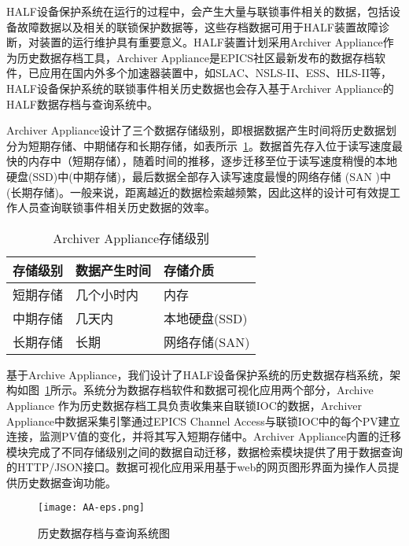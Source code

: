 HALF设备保护系统在运行的过程中，会产生大量与联锁事件相关的数据，包括设备故障数据以及相关的联锁保护数据等，这些存档数据可用于HALF装置故障诊断，对装置的运行维护具有重要意义。HALF装置计划采用Archiver Appliance作为历史数据存档工具，Archiver Appliance是EPICS社区最新发布的数据存档软件\cite{aa-homepage}，已应用在国内外多个加速器装置中，如SLAC、NSLS-II、ESS、HLS-II\cite{SHANKAR-2015,KORHONEN-2015,song-2019}等，HALF设备保护系统的联锁事件相关历史数据也会存入基于Archiver Appliance的HALF数据存档与查询系统中。

Archiver Appliance设计了三个数据存储级别，即根据数据产生时间将历史数据划分为短期存储、中期储存和长期存储，如表所示~\ref{table:4.5}。数据首先存入位于读写速度最快的内存中（短期存储），随着时间的推移，逐步迁移至位于读写速度稍慢的本地硬盘(SSD)中(中期存储)，最后数据全部存入读写速度最慢的网络存储 (SAN )中 (长期存储)。一般来说，距离越近的数据检索越频繁，因此这样的设计可有效提工作人员查询联锁事件相关历史数据的效率。

\begin{table}[!htb]
	\centering\small
	\caption{Archiver Appliance存储级别}
	\label{table:4.5}
	\begin{center}
	\begin{tabular}{lll}
	  \toprule
	  存储级别   & 数据产生时间   & 存储介质              \\
	  \midrule
	  短期存储 & 几个小时内  & 内存 \\
	  中期存储 & 几天内     & 本地硬盘(SSD)\\
	  长期存储 & 长期       &  网络存储(SAN) \\
	  \bottomrule
	\end{tabular}
	\end{center}
\end{table}

基于Archive Appliance，我们设计了HALF设备保护系统的历史数据存档系统，架构如图~\ref{fig:AA-eps}所示。系统分为数据存档软件和数据可视化应用两个部分，Archive Appliance 作为历史数据存档工具负责收集来自联锁IOC的数据，Archiver Appliance中数据采集引擎通过EPICS Channel Access与联锁IOC中的每个PV建立连接，监测PV值的变化，并将其写入短期存储中。Archiver Appliance内置的迁移模块完成了不同存储级别之间的数据自动迁移，数据检索模块提供了用于数据查询的HTTP/JSON接口。数据可视化应用采用基于web的网页图形界面为操作人员提供历史数据查询功能。

\begin{figure}[!htb]
	\centering
	\texttt{[image: AA-eps.png]}
	\caption{历史数据存档与查询系统图}
	\label{fig:AA-eps}
\end{figure}



